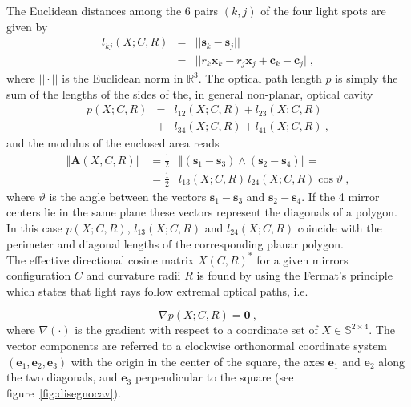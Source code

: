 \documentclass[12pt,a4paper,final]{iopart}
\begin{document}
The Euclidean distances among the $6$ pairs $(k,j)$ of the four light spots are given by 
\begin{eqnarray}
\label{eq:length}
l_{kj}(X;C,R) & = & ||\mathbf{s}_{k}-\mathbf{s}_{j}|| \nonumber \\
 & = & ||r{}_{k}\mathbf{x}_{k}-r_{j}\mathbf{x}_{j}+\mathbf{c}_{k}-\mathbf{c}_{j}|| , \label{eq:distance}
\end{eqnarray}
where $||\cdot||$ is the Euclidean norm in $\mathbb{R}^{3}$. The optical path length $p$ 
is simply the sum of the lengths of the sides of the, in general non-planar, optical cavity
\begin{eqnarray}
p(X;C,R)& = & l_{12}(X;C,R)+l_{23}(X;C,R) \nonumber \\ 
& +& l_{34}(X;C,R)+l_{41}(X;C,R) \nonumber \ ,
\end{eqnarray} and the modulus of the enclosed area reads
\begin{eqnarray}
\Vert \mathbf{A}(X,C,R)\Vert
& =\frac{1}{2} & \Vert (\mathbf{s}_{1}-\mathbf{s}_{3})\wedge(\mathbf{s}_{2}-\mathbf{s}_{4})
\Vert =\label{eq:arearing} \nonumber \\
 & =\frac{1}{2} & l_{13}(X;C,R)\, l_{24}(X;C,R)\cos\vartheta\ ,
\end{eqnarray} where $\vartheta$ is the angle between the vectors $\mathbf{s}_{1}-\mathbf{s}_{3}$
and \textbf{$\mathbf{s}_{2}-\mathbf{s}_{4}$}. If the 4 mirror centers
lie in the same plane these vectors represent the diagonals of a polygon.
In this case $p(X;C,R)$,
$l_{13}(X;C,R)$ and $l_{24}(X;C,R)$ coincide with the perimeter
and diagonal lengths of the corresponding planar polygon.\\

The effective directional cosine matrix $X(C,R)^{*}$ for a given
mirrors configuration $C$ and curvature radii $R$ is found by
using the Fermat's principle \cite{BornWolf} which states that light rays
follow extremal optical paths, i.e. 

\begin{equation}
\nabla p(X;C,R)=\mathbf{0}\ ,\label{eq:min}
\end{equation} where $\nabla(\cdot)$ is the gradient with respect to a coordinate set of $X\in \mathbb{S}^{2\times4}$. 
The vector components are referred 
to a clockwise orthonormal coordinate system
$\left(\mathbf{e}_{1},\mathbf{e}_{2},\mathbf{e}_{3}\right)$ with
the origin in the center of the square, the axes $\mathbf{e}_{1}$
and $\mathbf{e}_{2}$ along the two diagonals, and $\mathbf{e}_{3}$
perpendicular to the square (see figure~\ref{fig:disegnocav}).
\end{document}
